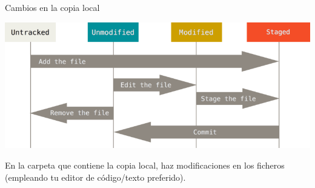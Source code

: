 \documentclass[aspectratio=169, xcolor={usenames,svgnames,dvipsnames}]{beamer}
\begin{document}
\begin{frame}[label={sec:org7c9eb46}]{Cambios en la copia local}
\begin{center}
\includegraphics[height=0.4\textheight]{figs/git_estados.png}
\end{center}

En la carpeta que contiene la copia local, haz \alert{modificaciones} en los ficheros (empleando tu editor de código/texto preferido).
\end{frame}
\end{document}

